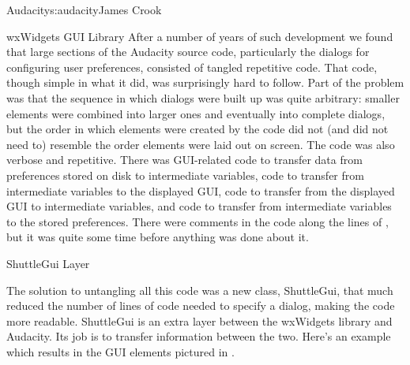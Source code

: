 \begin{aosachapter}{Audacity}{s:audacity}{James Crook}
\begin{aosasect1}{wxWidgets GUI Library}
After a number of years of such development we found that large
sections of the Audacity source code, particularly the dialogs for
configuring user preferences, consisted of tangled repetitive code.
That code, though simple in what it did, was surprisingly hard to
follow.  Part of the problem was that the sequence in which dialogs
were built up was quite arbitrary: smaller elements were combined into
larger ones and eventually into complete dialogs, but the order in
which elements were created by the code did not (and did not need to)
resemble the order elements were laid out on screen.  The code was
also verbose and repetitive.  There was GUI-related code to transfer
data from preferences stored on disk to intermediate variables, code
to transfer from intermediate variables to the displayed GUI, code to
transfer from the displayed GUI to intermediate variables, and code to
transfer from intermediate variables to the stored preferences.  There
were comments in the code along the lines of ,
but it was quite some time before anything was done about it.

\end{aosasect1}

\begin{aosasect1}{ShuttleGui Layer}

The solution to untangling all this code was a new class, ShuttleGui,
that much reduced the number of lines of code needed to specify a
dialog, making the code more readable.  ShuttleGui is an extra layer
between the wxWidgets library and Audacity.  Its job is to transfer
information between the two.  Here's an example which results in the
GUI elements pictured in .


\end{aosasect1}
\end{aosachapter}
